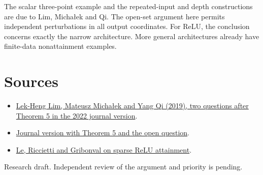 \documentclass[10pt]{article}
\begin{document}
The scalar three-point example and the repeated-input and depth constructions are due to Lim, Micha\l ek and Qi. The open-set argument here permits independent perturbations in all output coordinates. For ReLU, the conclusion concerns exactly the narrow architecture. More general architectures already have finite-data nonattainment examples.

\section*{Sources}
\begin{itemize}
\item \href{https://arxiv.org/abs/1907.01507}{Lek-Heng Lim, Mateusz Michałek and Yang Qi (2019), two questions after Theorem 5 in the 2022 journal version}.
\item \href{https://doi.org/10.1007/s00365-021-09545-2}{Journal version with Theorem 5 and the open question}.
\item \href{https://arxiv.org/abs/2306.02666}{Le, Riccietti and Gribonval on sparse ReLU attainment}.
\end{itemize}
{\small Research draft. Independent review of the argument and priority is pending.}
\end{document}
